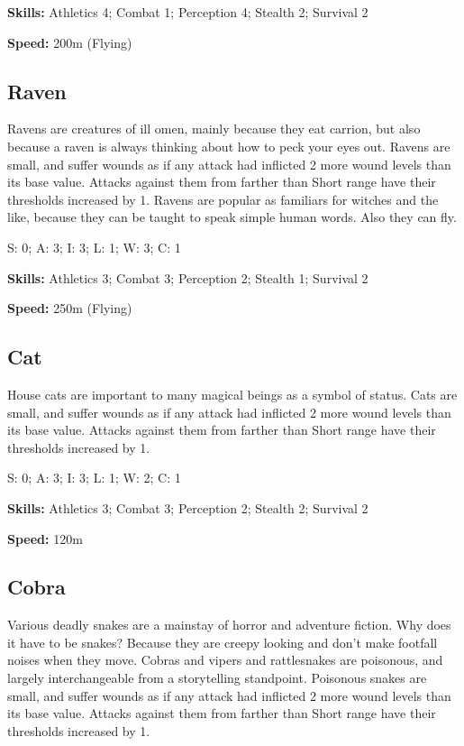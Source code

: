 \textbf{Skills:} Athletics 4; Combat 1; Perception 4; Stealth 2; Survival 2

\textbf{Speed:} 200m (Flying)

\subsection{Raven}
\hspace{\parindent} Ravens are creatures of ill omen, mainly because they eat carrion, but also because a raven is always thinking about how to peck your eyes out. Ravens are small, and suffer wounds as if any attack had inflicted 2 more wound levels than its base value. Attacks against them from farther than Short range have their thresholds increased by 1. Ravens are popular as familiars for witches and the like, because they can be taught to speak simple human words. Also they can fly.

S: 0; A: 3; I: 3; L: 1; W: 3; C: 1

\textbf{Skills:} Athletics 3; Combat 3; Perception 2; Stealth 1; Survival 2

\textbf{Speed:} 250m (Flying)

\subsection{Cat}
\hspace{\parindent} House cats are important to many magical beings as a symbol of status. Cats are small, and suffer wounds as if any attack had inflicted 2 more wound levels than its base value. Attacks against them from farther than Short range have their thresholds increased by 1.

S: 0; A: 3; I: 3; L: 1; W: 2; C: 1

\textbf{Skills:} Athletics 3; Combat 3; Perception 2; Stealth 2; Survival 2

\textbf{Speed:} 120m

\subsection{Cobra}
\hspace{\parindent} Various deadly snakes are a mainstay of horror and adventure fiction. Why does it have to be snakes? Because they are creepy looking and don't make footfall noises when they move. Cobras and vipers and rattlesnakes are poisonous, and largely interchangeable from a storytelling standpoint. Poisonous snakes are small, and suffer wounds as if any attack had inflicted 2 more wound levels than its base value. Attacks against them from farther than Short range have their thresholds increased by 1.

